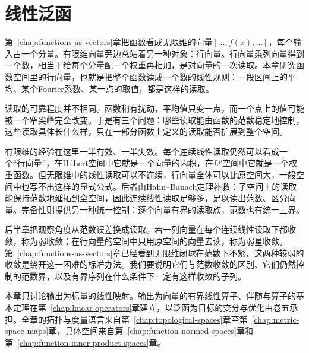 \chapter{线性泛函}
\label{chap:linear-functionals}
\label{chap:linear-functionals-operators}

第~\ref{chap:functions-as-vectors}章把函数看成无限维的向量$[\ldots,f(x),\ldots]$，每个输入占一个分量。有限维向量旁边总站着另一种对象：行向量。行向量乘列向量得到一个数，相当于给每个分量配一个权重再相加，是对向量的一次读取。本章研究函数空间里的行向量，也就是把整个函数读成一个数的线性规则：一段区间上的平均、某个Fourier系数、某一点的取值，都是这样的读取。

读取的可靠程度并不相同。函数稍有扰动，平均值只变一点，而一个点上的值可能被一个窄尖峰完全改变。于是有三个问题：哪些读取能由函数的范数稳定地控制，这些读取具体长什么样，只在一部分函数上定义的读取能否扩展到整个空间。

有限维的经验在这里一半有效、一半失效。每个连续线性读取仍然可以看成一个“行向量”，在Hilbert空间中它就是一个向量的内积，在$L^p$空间中它就是一个权重函数。但无限维中的线性读取可以不连续，行向量全体可以比原空间大，一般空间中也写不出这样的显式公式。后者由Hahn--Banach定理补救：子空间上的读取能保持范数地延拓到全空间，因此连续线性读取足够多，足以读出范数、区分向量。完备性则提供另一种统一控制：逐个向量有界的读取族，范数也有统一上界。

后半章把观察角度从范数误差换成读取。若一列向量在每个连续线性读取下都收敛，称为弱收敛；在行向量的空间中只用原空间的向量去读，称为弱星收敛。第~\ref{chap:functions-as-vectors}章已经看到无限维闭球在范数下不紧，这两种较弱的收敛是绕开这一困难的标准办法。我们要说明它们与范数收敛的区别、它们仍然控制的范数界，以及有界序列在什么条件下一定有这样收敛的子列。

本章只讨论输出为标量的线性映射。输出为向量的有界线性算子、伴随与算子的基本定理在第~\ref{chap:linear-operators}章建立，以泛函为目标的变分与优化由卷五承担。全章的拓扑与度量语言来自第~\ref{chap:topological-spaces}章至第~\ref{chap:metric-space-maps}章，具体空间来自第~\ref{chap:function-normed-spaces}章和第~\ref{chap:function-inner-product-spaces}章。








